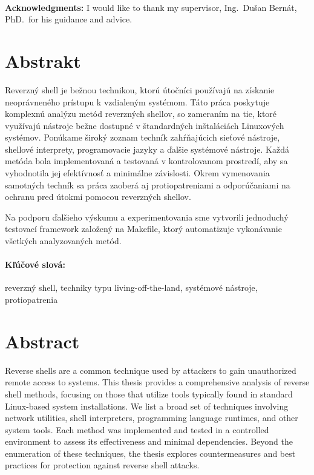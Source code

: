 \documentclass[12pt, twoside]{book}
\begin{document}


\newpage
\pagestyle{plain}
~

\vfill
{\bf Acknowledgments:} I would like to thank my supervisor, Ing.\ Dušan Bernát, PhD.\ for his guidance and advice.


\newpage
\section*{Abstrakt}

Reverzný shell je bežnou technikou, ktorú útočníci používajú na získanie neoprávneného prístupu k vzdialeným systémom. Táto práca poskytuje komplexnú analýzu metód reverzných shellov, so zameraním na tie, ktoré využívajú nástroje bežne dostupné v štandardných inštaláciách Linuxových systémov. Ponúkame široký zoznam techník zahŕňajúcich sieťové nástroje, shellové interprety, programovacie jazyky a ďalšie systémové nástroje. Každá metóda bola implementovaná a testovaná v kontrolovanom prostredí, aby sa vyhodnotila jej efektívnosť a minimálne závislosti. Okrem vymenovania samotných techník sa práca zaoberá aj protiopatreniami a odporúčaniami na ochranu pred útokmi pomocou reverzných shellov.

Na podporu ďalšieho výskumu a experimentovania sme vytvorili jednoduchý testovací framework založený na Makefile, ktorý automatizuje vykonávanie všetkých analyzovaných metód.

\paragraph*{Kľúčové slová:} reverzný shell, techniky typu living-off-the-land, systémové nástroje, protiopatrenia


\newpage 
\section*{Abstract}

Reverse shells are a common technique used by attackers to gain unauthorized remote access to systems. This thesis provides a comprehensive analysis of reverse shell methods, focusing on those that utilize tools typically found in standard Linux-based system installations. We list a broad set of techniques involving network utilities, shell interpreters, programming language runtimes, and other system tools. Each method was implemented and tested in a controlled environment to assess its effectiveness and minimal dependencies. Beyond the enumeration of these techniques, the thesis explores countermeasures and best practices for protection against reverse shell attacks.
\end{document}
